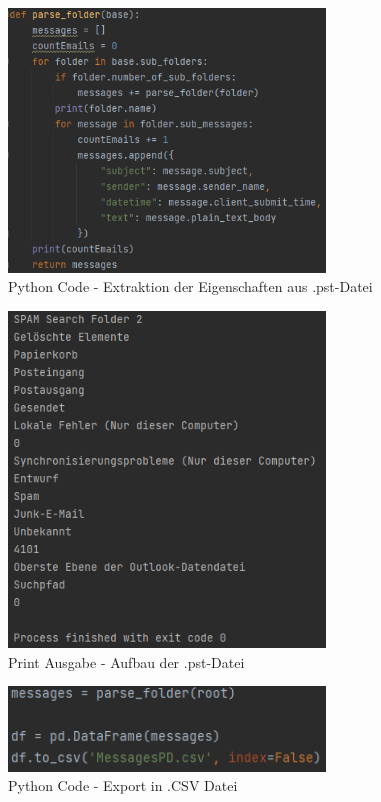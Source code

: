 \begin{figure}
    \centering
    \includegraphics[width=0.75\textwidth]{images/Extraktion_aus_Pst_file.PNG}
    \caption{Python Code - Extraktion der Eigenschaften aus .pst-Datei} 
    \label{fig:extraction}
\end{figure}

\begin{figure}
    \centering
    \includegraphics[width=0.75\textwidth]{images/PST_File_Aufbau_Python.png}
    \caption{Print Ausgabe - Aufbau der .pst-Datei} 
    \label{fig:pstfileaufbau}
\end{figure}

\begin{figure}
    \centering
    \includegraphics[width=0.75\textwidth]{images/Dataframe_messages.PNG}
    \caption{Python Code - Export in .CSV Datei} 
    \label{fig:dataframeparstetocsv}
\end{figure}